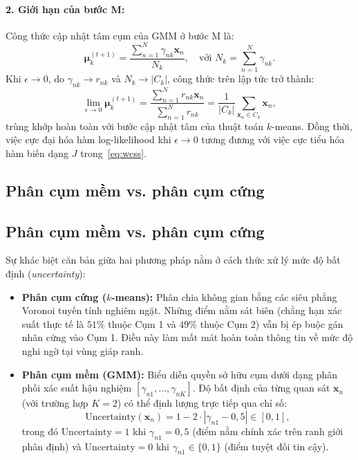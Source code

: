 \paragraph{2. Giới hạn của bước M:}
Công thức cập nhật tâm cụm của GMM ở bước M là:
\begin{equation}
    \boldsymbol{\mu}_k^{(t+1)} = \frac{\sum_{n=1}^N \gamma_{nk} \mathbf{x}_n}{N_k}, \quad \text{với } N_k = \sum_{n=1}^N \gamma_{nk}.
\end{equation}
Khi $\epsilon \to 0$, do $\gamma_{nk} \to r_{nk}$ và $N_k \to |C_k|$, công thức trên lập tức trở thành:
\begin{equation}
    \lim_{\epsilon \to 0} \boldsymbol{\mu}_k^{(t+1)} = \frac{\sum_{n=1}^N r_{nk} \mathbf{x}_n}{\sum_{n=1}^N r_{nk}} = \frac{1}{|C_k|} \sum_{\mathbf{x}_n \in C_k} \mathbf{x}_n,
\end{equation}
trùng khớp hoàn toàn với bước cập nhật tâm của thuật toán $k$-means. Đồng thời, việc cực đại hóa hàm log-likelihood khi $\epsilon \to 0$ tương đương với việc cực tiểu hóa hàm biến dạng $J$ trong~\eqref{eq:wcss}.

\subsection{Phân cụm mềm vs. phân cụm cứng}

\subsection{Phân cụm mềm vs. phân cụm cứng}

Sự khác biệt căn bản giữa hai phương pháp nằm ở cách thức xử lý mức độ bất định (\textit{uncertainty}):
\begin{itemize}
    \item \textbf{Phân cụm cứng ($k$-means):} Phân chia không gian bằng các siêu phẳng Voronoi tuyến tính nghiêm ngặt. Những điểm nằm sát biên (chẳng hạn xác suất thực tế là $51\%$ thuộc Cụm 1 và $49\%$ thuộc Cụm 2) vẫn bị ép buộc gán nhãn cứng vào Cụm 1. Điều này làm mất mát hoàn toàn thông tin về mức độ nghi ngờ tại vùng giáp ranh.
    \item \textbf{Phân cụm mềm (GMM):} Biểu diễn quyền sở hữu cụm dưới dạng phân phối xác suất hậu nghiệm $[\gamma_{n1}, \dots, \gamma_{nK}]$. Độ bất định của từng quan sát $\mathbf{x}_n$ (với trường hợp $K = 2$) có thể định lượng trực tiếp qua chỉ số:
    \begin{equation}
        \text{Uncertainty}(\mathbf{x}_n) = 1 - 2\cdot \left|\gamma_{n1} - 0{,}5\right| \in [0, 1], \label{eq:uncertainty_metric}
    \end{equation}
    trong đó $\text{Uncertainty} = 1$ khi $\gamma_{n1} = 0{,}5$ (điểm nằm chính xác trên ranh giới phân định) và $\text{Uncertainty} = 0$ khi $\gamma_{n1} \in \{0, 1\}$ (điểm tuyệt đối tin cậy).
\end{itemize}

